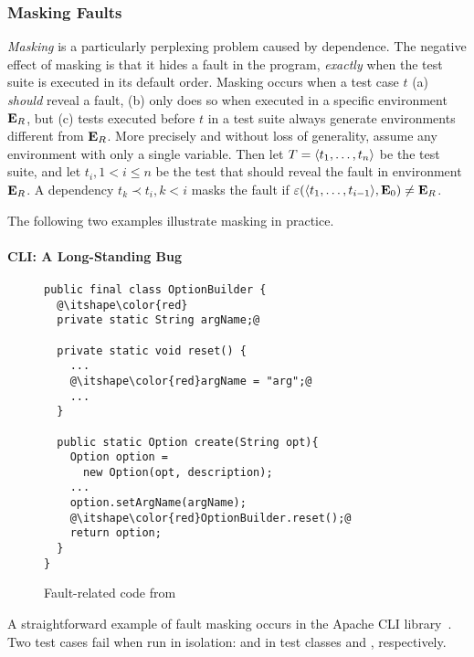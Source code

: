 
\subsubsection{Masking Faults}\label{sec:mask}

\emph{Masking} is a particularly perplexing problem caused by
dependence.
The negative effect of masking is that it hides a fault in the
program, \emph{exactly} when the test suite is executed in its default
order. 
Masking occurs when a test case $t$ (a) \emph{should}
reveal a fault, (b) only does so when executed in a specific environment
$\mathbf{E}_R$, but (c) tests executed before $t$ in a test suite always
generate environments different from
$\mathbf{E}_R$.
More precisely and without loss of generality, assume any
environment with only a single variable. Then let $T =
 \langle t_1,\dots,t_n \rangle $ be the test suite, and let $t_i, 1 < i \leq n$
be the test that should reveal the fault in environment $\mathbf{E}_R$. A
dependency $t_k \prec t_i, k < i$ masks the fault if
$\varepsilon( \langle t_1,\dots,t_{i-1} \rangle ,\mathbf{E}_0) \neq \mathbf{E}_R$.

The following two examples illustrate masking in
practice.

\paragraph{CLI: A Long-Standing Bug}

\begin{figure}
\begin{lstlisting}
public final class OptionBuilder {
  @\itshape\color{red}
  private static String argName;@
  
  private static void reset() {
    ...
    @\itshape\color{red}argName = "arg";@
    ...
  }
   
  public static Option create(String opt){
    Option option = 
      new Option(opt, description);
    ...
    option.setArgName(argName);
    @\itshape\color{red}OptionBuilder.reset();@
    return option;
  }
}
\end{lstlisting}
\caption{Fault-related code from }
\label{fig:option_builder}
\end{figure}

A straightforward example of fault masking occurs in the Apache CLI
library~\cite{cli}.
Two test cases fail when run in isolation:
 and  in test
classes  and ,
respectively.

